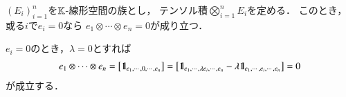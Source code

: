 	\begin{screen}
		\begin{thm}
		\label{thm:when_tensor_product_zero}
			$(E_i)_{i=1}^n$を$\mathbb{K}$-線形空間の族とし，
			テンソル積$\bigotimes_{i=1}^n E_i$を定める．
			このとき，或る$i$で$e_i = 0$なら
			$e_1 \otimes \cdots \otimes e_n = 0$が成り立つ．
		\end{thm}
	\end{screen}
	
	\begin{prf}
		$e_i = 0$のとき，$\lambda = 0$とすれば
		\begin{align}
			e_1 \otimes \cdots \otimes e_n
			= \left[ \mbox{1}\hspace{-0.25em}\mbox{l}_{e_1,\cdots,0,\cdots,e_n} \right]
			= \left[ \mbox{1}\hspace{-0.25em}\mbox{l}_{e_1,\cdots,\lambda e_i,\cdots,e_n} - \lambda \mbox{1}\hspace{-0.25em}\mbox{l}_{e_1,\cdots,e_i,\cdots,e_n}\right]
			= 0
		\end{align}
		が成立する．
		\QED
	\end{prf}
	
